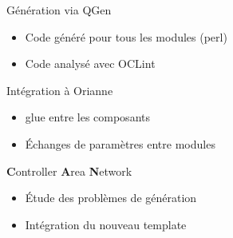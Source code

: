 \documentclass[xcolor=x11names,compress]{beamer}
\begin{document}
\begin{frame}{Génération via QGen}
  \begin{itemize}
	\item Code généré pour tous les modules (perl)
	\item Code analysé avec OCLint
  \end{itemize}
\end{frame}

\begin{frame}{Intégration à Orianne}
  \begin{itemize}
	\item \og glue \fg{} entre les composants
	\item Échanges de paramètres entre modules
  \end{itemize}
\end{frame}

\begin{frame}{{\bf C}ontroller {\bf A}rea {\bf N}etwork}
  \begin{itemize}
	\item Étude des problèmes de génération
	\item Intégration du nouveau template
  \end{itemize}
\end{frame}


\section*{}
\end{document}
